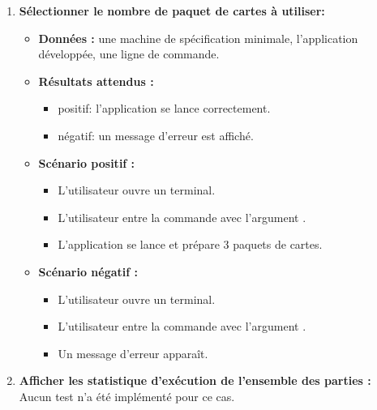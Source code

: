 \begin{enumerate}
    \item \textbf{Sélectionner le nombre de paquet de cartes à utiliser:}
    \begin{itemize}
        \item \textbf{Données :} une machine de spécification minimale, l'application développée, une ligne de commande.
        \item \textbf{Résultats attendus :} 
        \begin{itemize}
            \item positif: l'application se lance correctement. \item négatif: un message d'erreur est affiché.
        \end{itemize}
        \item \textbf{Scénario positif :}
        \begin{itemize}
            \item L’utilisateur ouvre un terminal.
            \item L’utilisateur entre la commande avec l'argument .
            \item L'application se lance et prépare 3 paquets de cartes.
        \end{itemize}
        \item \textbf{Scénario négatif :}
        \begin{itemize}
            \item L’utilisateur ouvre un terminal.
            \item L’utilisateur entre la commande avec l'argument .
            \item Un message d'erreur apparaît.
        \end{itemize}
    \end{itemize}

    \item \textbf{Afficher les statistique d'exécution de l'ensemble des parties :} \\
    Aucun test n'a été implémenté pour ce cas.


\end{enumerate}
